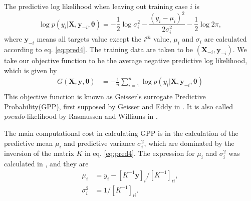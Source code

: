 \documentclass[11pt,a4paper]{article}
\theoremstyle{definition}
\numberwithin{equation}{section}
\let\vec\mathbf
\begin{document}
	The predictive log likelihood when leaving out training case $i$ is
	\begin{equation}\label{GPP_1}
	\log p(y_i|\vec X,\vec y_{-i},\vec \theta) = -\frac{1}{2}\log\sigma^2_i - \frac{(y_i - \mu_i)^2}{2\sigma^2_i} - \frac{1}{2} \log 2 \pi, 
	\end{equation}
	where $\vec y_{-i}$  means all targets value except the $i^{th}$ value, $\mu_i$ and $\sigma_i$ are calculated according to eq. \ref{eq:pred4}. The training data are taken to be $(\vec X_{-i},\vec y_{-i})$. We take our objective function to be the average negative predictive log likelihood, which is given by
	\begin{equation}\label{GPP}
	\begin{split}
	G(\vec X,\vec y, \vec \theta) &= -\frac{1}{n}\sum_{i=1}^{n}\log p(y_i|\vec X,\vec y_{-i},\vec \theta)\\
	\end{split}
	\end{equation}
	This objective function is known as Geisser's surrogate Predictive Probability(GPP), first supposed by Geisser and Eddy in \cite{Geisser_Eddy}. It is also called \textit{pseudo}-likelihood by Rasmussen and Williams in \cite[sec. 5.4]{RandW}. 
	
	The main computational cost in calculating GPP is in the calculation of the predictive mean $\mu_i$ and predictive variance $\sigma^2_i$, which are dominated by the inversion of the matrix $K$ in eq. \ref{eq:pred4}. The expression for $\mu_i$ and $\sigma^2_i$ was calculated in \cite{Sundararajan_Keerthi}, and they are
	\begin{equation}\label{GPP_2}
	\begin{split}
	\mu_i &= y_i - [K^{-1}\vec y]_i/[K^{-1}]_{ii},\\
	\sigma^2_i &= 1/[K^{-1}]_{ii}.
	\end{split}
	\end{equation}
	
\end{document}
